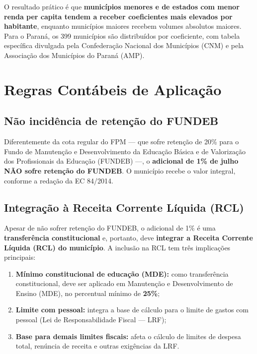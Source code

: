 \documentclass[12pt,a4paper]{article}
\begin{document}
O resultado prático é que \textbf{municípios menores e de estados com menor renda per capita tendem a receber coeficientes mais elevados por habitante}, enquanto municípios maiores recebem volumes absolutos maiores. Para o Paraná, os 399 municípios são distribuídos por coeficiente, com tabela específica divulgada pela Confederação Nacional dos Municípios (CNM) e pela Associação dos Municípios do Paraná (AMP).

\section{Regras Contábeis de Aplicação}

\subsection{Não incidência de retenção do FUNDEB}

Diferentemente da cota regular do FPM --- que sofre retenção de 20\% para o Fundo de Manutenção e Desenvolvimento da Educação Básica e de Valorização dos Profissionais da Educação (FUNDEB) ---, o \textbf{adicional de 1\% de julho NÃO sofre retenção do FUNDEB}. O município recebe o valor integral, conforme a redação da EC 84/2014.

\subsection{Integração à Receita Corrente Líquida (RCL)}

Apesar de não sofrer retenção do FUNDEB, o adicional de 1\% é uma \textbf{transferência constitucional} e, portanto, deve \textbf{integrar a Receita Corrente Líquida (RCL) do município}. A inclusão na RCL tem três implicações principais:

\begin{enumerate}[leftmargin=2.5em]
  \item \textbf{Mínimo constitucional de educação (MDE):} como transferência constitucional, deve ser aplicado em Manutenção e Desenvolvimento de Ensino (MDE), no percentual mínimo de \textbf{25\%};
  \item \textbf{Limite com pessoal:} integra a base de cálculo para o limite de gastos com pessoal (Lei de Responsabilidade Fiscal --- LRF);
  \item \textbf{Base para demais limites fiscais:} afeta o cálculo de limites de despesa total, renúncia de receita e outras exigências da LRF.
\end{enumerate}
\end{document}

